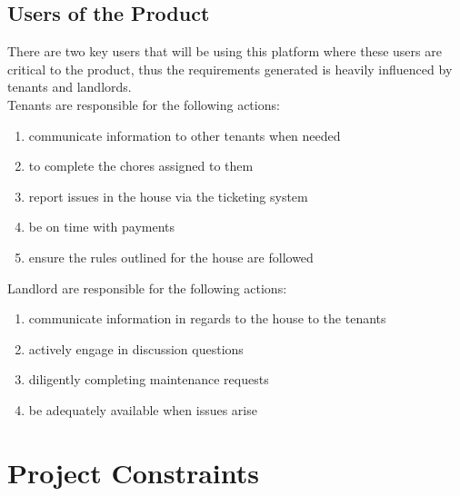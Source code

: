 \documentclass[12pt, titlepage]{article}
\begin{document}
\subsection{Users of the Product}
There are two key users that will be using this platform where these users are 
critical to the product, thus the requirements generated is heavily influenced 
by tenants and landlords.\\
Tenants are responsible for the following actions:
\begin{enumerate}
\item communicate information to other tenants when needed
\item to complete the chores assigned to them
\item report issues in the house via the ticketing system
\item be on time with payments
\item ensure the rules outlined for the house are followed
\end{enumerate}
Landlord are responsible for the following actions:
\begin{enumerate}
\item communicate information in regards to the house to the tenants
\item actively engage in discussion questions
\item diligently completing maintenance requests
\item be adequately available when issues arise
\end{enumerate}


\section{Project Constraints}
\end{document}
